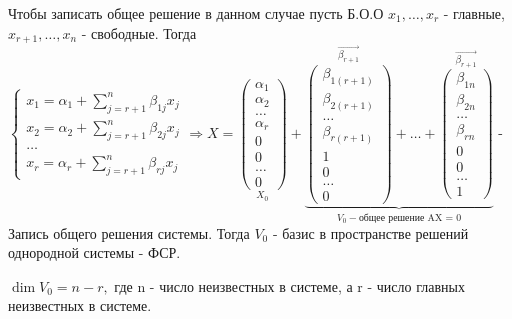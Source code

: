 Чтобы записать общее решение в данном случае пусть Б.О.О \(x_1, \ldots, x_r\) - главные, \(x_{r+1},\ldots, x_n\) - свободные. Тогда \(\left\{\begin{gathered}
	x_1 = \alpha_1 + \sum_{j = r+1}^{n}\beta_{1j}x_j \\
	x_2 = \alpha_2 + \sum_{j = r+1}^{n}\beta_{2j}x_j\\
	\ldots \\
	x_r = \alpha_r + \sum_{j = r+1}^{n}\beta_{rj}x_j
\end{gathered}\right.\Longrightarrow X = \underset{X_0}{\begin{pmatrix}
\alpha_1 \\ \alpha_2 \\ \ldots \\ \alpha_r \\ 0 \\ 0 \\ \ldots \\ 0
\end{pmatrix}}+ \underbrace{\overset{\vec{\beta_{r+1}}}{\begin{pmatrix}
\beta_{1(r+1)} \\ \beta_{2(r+1)} \\ \ldots \\ \beta_{r(r+1)} \\ 1 \\ 0 \\ \ldots \\ 0
\end{pmatrix}} + \ldots + \overset{\vec{\beta_{r+1}}}{\begin{pmatrix}
\beta_{1n} \\ \beta_{2n} \\ \ldots \\ \beta_{rn} \\ 0 \\ 0 \\ \ldots \\ 1
\end{pmatrix}}}_{V_0 - \text{общее решение AX = 0}}\) - Запись общего решения системы. Тогда \(V_0\) - базис в пространстве решений однородной системы - ФСР.
\begin{corollary}
	\(\dim V_0 = n - r,\) где n - число неизвестных в системе, а r - число главных неизвестных в системе.
\end{corollary}



